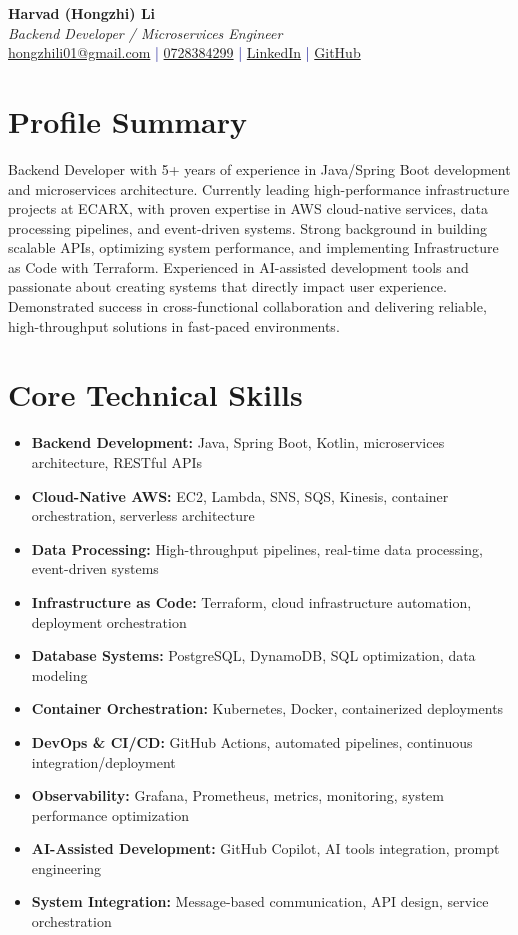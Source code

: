 \documentclass[11pt,a4paper]{article}
\begin{document}
\pagestyle{empty} %

\begin{center}
{\LARGE \textbf{Harvad (Hongzhi) Li}}\\[10pt]
{\Large \textit{Backend Developer / Microservices Engineer}}\\[10pt]
\textcolor{darkblue}{\href{mailto:hongzhili01@google.com}{hongzhili01@gmail.com} | \href{tel:0728384299}{0728384299} | \href{https://www.linkedin.com/in/harvad/}{LinkedIn} | \href{https://github.com/bluehawana}{GitHub}}
\end{center}

\section*{Profile Summary}
Backend Developer with 5+ years of experience in Java/Spring Boot development and microservices architecture. Currently leading high-performance infrastructure projects at ECARX, with proven expertise in AWS cloud-native services, data processing pipelines, and event-driven systems. Strong background in building scalable APIs, optimizing system performance, and implementing Infrastructure as Code with Terraform. Experienced in AI-assisted development tools and passionate about creating systems that directly impact user experience. Demonstrated success in cross-functional collaboration and delivering reliable, high-throughput solutions in fast-paced environments.

\section*{Core Technical Skills}
\begin{itemize}[noitemsep]
\item \textbf{Backend Development:} Java, Spring Boot, Kotlin, microservices architecture, RESTful APIs
\item \textbf{Cloud-Native AWS:} EC2, Lambda, SNS, SQS, Kinesis, container orchestration, serverless architecture
\item \textbf{Data Processing:} High-throughput pipelines, real-time data processing, event-driven systems
\item \textbf{Infrastructure as Code:} Terraform, cloud infrastructure automation, deployment orchestration
\item \textbf{Database Systems:} PostgreSQL, DynamoDB, SQL optimization, data modeling
\item \textbf{Container Orchestration:} Kubernetes, Docker, containerized deployments
\item \textbf{DevOps \& CI/CD:} GitHub Actions, automated pipelines, continuous integration/deployment
\item \textbf{Observability:} Grafana, Prometheus, metrics, monitoring, system performance optimization
\item \textbf{AI-Assisted Development:} GitHub Copilot, AI tools integration, prompt engineering
\item \textbf{System Integration:} Message-based communication, API design, service orchestration
\end{itemize}
\end{document}
